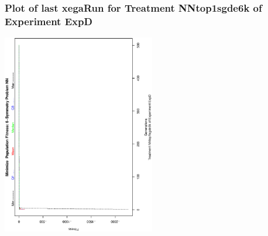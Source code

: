  \begin{frame}
 \frametitle{ Plot of last xegaRun for Treatment NNtop1sgde6k of Experiment ExpD }
 \begin{center}
\includegraphics[width=0.5\textwidth, angle=-90]
{ExpDPlotPopStatsFigure009.eps}
 \end{center}
 \label{report/ExpDPlotPopStatsFigure009.eps}  
 \end{frame}

